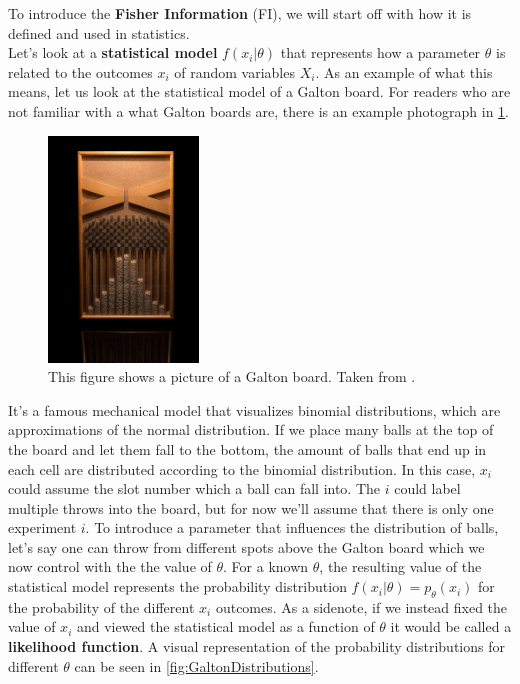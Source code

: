 To introduce the \textbf{Fisher Information} (FI), we will start off with how it is defined and used in statistics.\\
Let's look at a \textbf{statistical model} $f(x_i|\theta)$ that represents how a parameter $\theta$ is related to the outcomes $x_i$ of random variables $X_i$\cite{StatisticFisherInfoTutorial}. As an example of what this means, let us look at the statistical model of a Galton board. For readers who are not familiar with a what Galton boards are, there is an example photograph in \cref{fig:GaltonPicture}. 
\begin{figure}
	\centering
	\includegraphics[width = 4cm]{text/FisherInformation/plots/GaltonBoard.jpg}
	\caption{This figure shows a picture of a Galton board. Taken from \cite{GaltonBoardPicture}.}
	\label{fig:GaltonPicture}
\end{figure}
It's a famous mechanical model that visualizes binomial distributions, which are approximations of the normal distribution. If we place many balls at the top of the board and let them fall to the bottom, the amount of balls that end up in each cell are distributed according to the binomial distribution. In this case, $x_i$ could assume the slot number which a ball can fall into. The $i$ could label multiple throws into the board, but for now we'll assume that there is only one experiment $i$. To introduce a parameter that influences the distribution of balls, let's say one can throw from different spots above the Galton board which we now control with the the value of $\theta$. For a known $\theta$, the resulting value of the statistical model represents the probability distribution $f(x_i|\theta) = p_\theta(x_i)$ for the probability of the different $x_i$ outcomes. As a sidenote, if we instead fixed the value of $x_i$ and viewed the statistical model as a function of $\theta$ it would be called a \textbf{likelihood function}. A visual representation of the probability distributions for different $\theta$ can be seen in \cref{fig:GaltonDistributions}.
